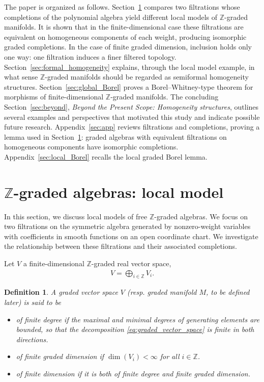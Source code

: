 \documentclass[a4paper,12pt]{amsart}
\newtheorem{deff}{Definition}
\newcommand{\beq}{\begin{eqnarray}}
\newcommand{\eeq}{\end{eqnarray}}
\newcommand{\Z}{{\mathbb Z}}
\begin{document}
\smallskip\noindent 
The paper is organized as follows. Section~\ref{sec:semiformal} compares two filtrations whose completions of the polynomial algebra yield different local models of $\mathbb{Z}$-graded manifolds. It is shown that in the finite-dimensional case these filtrations are equivalent on homogeneous components of each weight, producing isomorphic graded completions.
 In the case of finite graded dimension, inclusion holds only one way: one filtration induces a finer filtered topology. Section~\ref{sec:formal_homogeneity} explains, through the local model example, in what sense $\mathbb{Z}$-graded manifolds should be regarded as semiformal homogeneity structures. Section~\ref{sec:global_Borel} proves a Borel--Whitney-type theorem for morphisms of finite-dimensional $\mathbb{Z}$-graded manifolds. The concluding Section~\ref{sec:beyond}, \emph{Beyond the Present Scope: Homogeneity structures}, outlines several examples and perspectives that motivated this study and indicate possible future research.
 Appendix~\ref{sec:app} reviews filtrations and completions, proving a lemma used in Section~\ref{sec:semiformal}: graded algebras with equivalent filtrations on homogeneous components have isomorphic completions. Appendix~\ref{sec:local_Borel} recalls the local graded Borel lemma.




\section{$\mathbb{Z}$-graded algebras: local model}\label{sec:semiformal}

\noindent In this section, we discuss local models of free $\Z$-graded algebras. We focus on two filtrations on the symmetric algebra generated by nonzero-weight variables with coefficients in smooth functions on an open coordinate chart. We investigate the relationship between these filtrations and their associated completions.


\smallskip\noindent Let $V$ a finite-dimensional $\mathbb{Z}$-graded real vector space,
\beq\label{eq:graded_vector_space}
V = \bigoplus_{i \in \mathbb{Z}} V_i.
\eeq

\begin{deff} \label{def-finite-gr}  
A graded vector space $V$ (resp. graded manifold $M$, to be defined later) is said to be
\begin{itemize}
\item \emph{of finite degree} if the maximal and minimal degrees of generating elements are bounded, so that the decomposition \eqref{eq:graded_vector_space} is finite in both directions.
\smallskip
\item \emph{of finite graded dimension} if $\dim(V_i) < \infty$ for all $i \in \mathbb{Z}$.
\smallskip
\item \emph{of finite dimension} if it is both of finite degree and finite graded dimension.
\end{itemize}
\end{deff}
\end{document}
